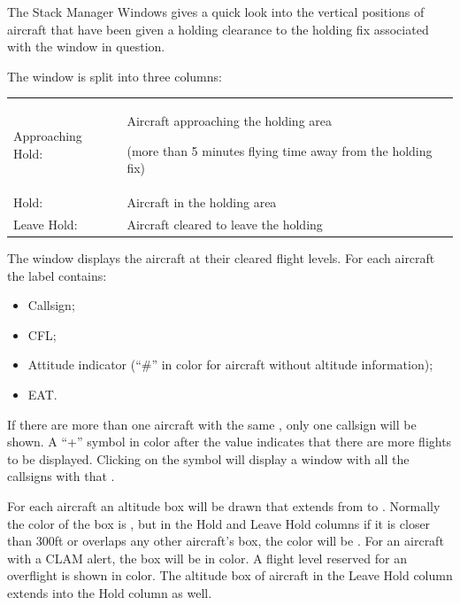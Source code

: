 \documentclass[a4paper,oneside,11pt]{memoir}
\begin{document}

The Stack Manager Windows gives a quick look into the vertical positions of aircraft that have been given a holding clearance to the holding fix associated with the window in question.

\bigskip

The window is split into three columns:

\bigskip

\begin{longtable}{p{2.5cm} p{10cm}}
    Approaching Hold:   & Aircraft approaching the holding area
    
                          (more than 5 minutes flying time away from the holding fix)\\
    Hold:               & Aircraft in the holding area\\
    Leave Hold:         & Aircraft cleared to leave the holding\\   
\end{longtable}

\bigskip

The window displays the aircraft at their cleared flight levels. For each aircraft the label contains:

\begin{itemize}
  \item Callsign;
  \item CFL;
  \item Attitude indicator (“\#” in  color for aircraft without altitude information);
  \item EAT.
\end{itemize}

If there are more than one aircraft with the same , only one callsign will be shown. A “+” symbol in  color after the  value indicates that there are more flights to be displayed. Clicking on the symbol will display a window with all the callsigns with that .

\bigskip

For each aircraft an altitude box will be drawn that extends from  to . Normally the color of the box is , but in the Hold and Leave Hold columns if it is closer than 300ft or overlaps any other aircraft’s box, the color will be . For an aircraft with a CLAM alert, the box will be in  color. A flight level reserved for an overflight is shown in  color. The altitude box of aircraft in the Leave Hold column extends into the Hold column as well.
\end{document}
